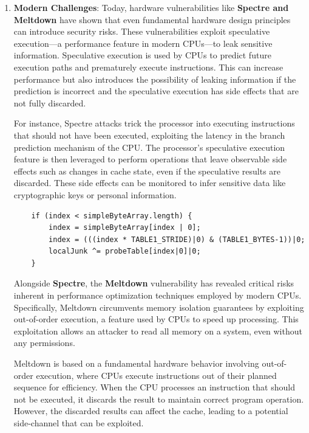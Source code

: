\begin{enumerate}
  \def\labelenumi{\arabic{enumi}.}
  \setcounter{enumi}{3}
  \item
    \textbf{Modern Challenges}: Today, hardware vulnerabilities like
    \textbf{Spectre and Meltdown}\cite{SpectreSecurityVulnerability2024,MeltdownSecurityVulnerability2024} have shown that even fundamental
    hardware design principles can introduce security risks. These
    vulnerabilities exploit speculative execution---a performance feature
    in modern CPUs---to leak sensitive information. Speculative execution is used by CPUs to predict future execution paths and prematurely execute instructions. This can increase performance but also introduces the possibility of leaking information if the prediction is incorrect and the speculative execution has side effects that are not fully discarded.
  
    For instance, Spectre attacks trick the processor into executing instructions that should not have been executed, exploiting the latency in the branch prediction mechanism of the CPU. The processor's speculative execution feature is then leveraged to perform operations that leave observable side effects such as changes in cache state, even if the speculative results are discarded. These side effects can be monitored to infer sensitive data like cryptographic keys or personal information. \cite{kocherSpectreAttacksExploiting2018}
  
    \begin{verbatim}
    if (index < simpleByteArray.length) {
        index = simpleByteArray[index | 0];
        index = (((index * TABLE1_STRIDE)|0) & (TABLE1_BYTES-1))|0;
        localJunk ^= probeTable[index|0]|0;
    }
    \end{verbatim}

      Alongside \textbf{Spectre}, the \textbf{Meltdown} vulnerability has revealed critical risks inherent in performance optimization techniques employed by modern CPUs. Specifically, Meltdown circumvents memory isolation guarantees by exploiting out-of-order execution, a feature used by CPUs to speed up processing. This exploitation allows an attacker to read all memory on a system, even without any permissions.

      Meltdown is based on a fundamental hardware behavior involving out-of-order execution, where CPUs execute instructions out of their planned sequence for efficiency. When the CPU processes an instruction that should not be executed, it discards the result to maintain correct program operation. However, the discarded results can affect the cache, leading to a potential side-channel that can be exploited. 


\end{enumerate}
